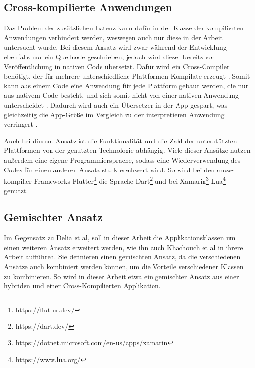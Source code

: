 \subsection{Cross-kompilierte Anwendungen}
Das Problem der zusätzlichen Latenz kann dafür in der Klasse der kompilierten Anwendungen verhindert werden, weswegen auch nur diese in der Arbeit untersucht wurde. Bei diesem Ansatz wird zwar während der Entwicklung ebenfalls nur ein Quellcode geschrieben, jedoch wird dieser bereits vor Veröffentlichung in nativen Code übersetzt. Dafür wird ein Cross-Compiler benötigt, der für mehrere unterschiedliche Plattformen Kompilate erzeugt \cite{mobiledraft_cross_plattform}. Somit kann aus einem Code eine Anwendung für jede Plattform gebaut werden, die nur aus nativem Code besteht, und sich somit nicht von einer nativen Anwendung unterscheidet \cite{IEEE_development_classes}. Dadurch wird auch ein Übersetzer in der App gespart, was gleichzeitig die App-Größe im Vergleich zu der interpretieren Anwendung verringert \cite{mobiledraft_cross_plattform}.

Auch bei diesem Ansatz ist die Funktionalität und die Zahl der unterstützten Plattformen von der genutzten Technologie abhängig. Viele dieser Ansätze nutzen außerdem eine eigene Programmiersprache, sodass eine Wiederverwendung des Codes für einen anderen Ansatz stark erschwert wird. So wird bei den cross-kompilier Frameworks Flutter\footnote{https://flutter.dev/} die Sprache Dart\footnote{https://dart.dev/} und bei Xamarin\footnote{https://dotnet.microsoft.com/en-us/apps/xamarin} Lua\footnote{https://www.lua.org/} genutzt.


\subsection{Gemischter Ansatz}
Im Gegensatz zu Delia et al, soll in dieser Arbeit die Applikationsklassen um einen weiteren Ansatz erweitert werden, wie ihn auch Khachouch et al \cite{IEEE_Khackouch_Al} in ihrere Arbeit aufführen. Sie definieren einen gemischten Ansatz, da die verschiedenen Ansätze auch kombiniert werden können, um die Vorteile verschiedener Klassen zu kombinieren. So wird in dieser Arbeit etwa ein gemischter Ansatz aus einer hybriden und einer Cross-Kompilierten Applikation.
